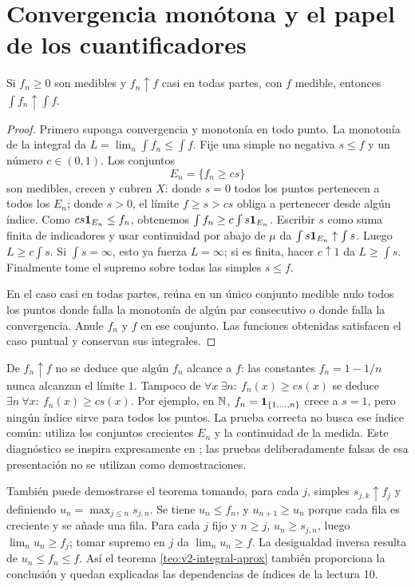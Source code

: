 \section{Convergencia monótona y el papel de los cuantificadores}\label{lectura:v2-10}
\begin{teorema}\label{teo:v2-mct}
Si $f_n\ge0$ son medibles y $f_n\uparrow f$ casi en todas partes, con $f$ medible, entonces $\int f_n\uparrow\int f$.
\end{teorema}
\begin{proof}
Primero suponga convergencia y monotonía en todo punto. La monotonía de la integral da $L=\lim_n\int f_n\le\int f$. Fije una simple no negativa $s\le f$ y un número $c\in(0,1)$. Los conjuntos
\[E_n=\{f_n\ge cs\}\]
son medibles, crecen y cubren $X$: donde $s=0$ todos los puntos pertenecen a todos los $E_n$; donde $s>0$, el límite $f\ge s>cs$ obliga a pertenecer desde algún índice. Como $cs\mathbf1_{E_n}\le f_n$, obtenemos $\int f_n\ge c\int s\mathbf1_{E_n}$. Escribir $s$ como suma finita de indicadores y usar continuidad por abajo de $\mu$ da $\int s\mathbf1_{E_n}\uparrow\int s$. Luego $L\ge c\int s$. Si $\int s=\infty$, esto ya fuerza $L=\infty$; si es finita, hacer $c\uparrow1$ da $L\ge\int s$. Finalmente tome el supremo sobre todas las simples $s\le f$.

En el caso casi en todas partes, reúna en un único conjunto medible nulo todos los puntos donde falla la monotonía de algún par consecutivo o donde falla la convergencia. Anule $f_n$ y $f$ en ese conjunto. Las funciones obtenidas satisfacen el caso puntual y conservan sus integrales.
\end{proof}
\begin{observacion}
De $f_n\uparrow f$ no se deduce que algún $f_n$ alcance a $f$: las constantes $f_n=1-1/n$ nunca alcanzan el límite $1$. Tampoco de $\forall x\ \exists n:\ f_n(x)\ge cs(x)$ se deduce $\exists n\ \forall x:\ f_n(x)\ge cs(x)$. Por ejemplo, en $\mathbb N$, $f_n=\mathbf1_{\{1,\ldots,n\}}$ crece a $s=1$, pero ningún índice sirve para todos los puntos. La prueba correcta no busca ese índice común: utiliza los conjuntos crecientes $E_n$ y la continuidad de la medida. Este diagnóstico se inspira expresamente en \cite{maximenkoFalsas}; las pruebas deliberadamente falsas de esa presentación no se utilizan como demostraciones.
\end{observacion}
\begin{observacion}
También puede demostrarse el teorema tomando, para cada $j$, simples $s_{j,k}\uparrow f_j$ y definiendo $u_n=\max_{j\le n}s_{j,n}$. Se tiene $u_n\le f_n$, y $u_{n+1}\ge u_n$ porque cada fila es creciente y se añade una fila. Para cada $j$ fijo y $n\ge j$, $u_n\ge s_{j,n}$, luego $\lim_nu_n\ge f_j$; tomar supremo en $j$ da $\lim_nu_n\ge f$. La desigualdad inversa resulta de $u_n\le f_n\le f$. Así el teorema \ref{teo:v2-integral-aprox} también proporciona la conclusión y quedan explicadas las dependencias de índices de la lectura 10.
\end{observacion}

